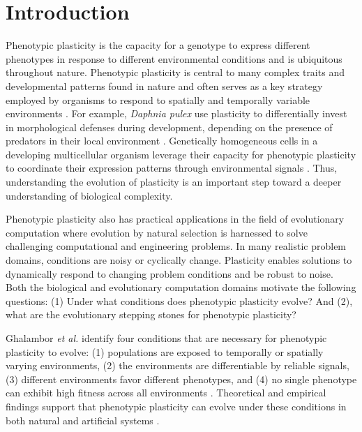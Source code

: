 \section{Introduction}
\label{chapter:origins-of-plasticity:sec:introduction}

Phenotypic plasticity is the capacity for a genotype to express different phenotypes in response to different environmental conditions \citep{ghalambor_behavior_2010} and is ubiquitous throughout nature. 
Phenotypic plasticity is central to many complex traits and developmental patterns found in nature and often serves as a key strategy employed by organisms to respond to spatially and temporally variable environments \citep{bradshaw_evolutionary_1965,murren_constraints_2015}.
For example, \textit{Daphnia pulex} use plasticity to differentially invest in morphological defenses during development, depending on the presence of predators in their local environment \citep{black_demographic_1990}. 
Genetically homogeneous cells in a developing multicellular organism leverage their capacity for phenotypic plasticity to coordinate their expression patterns through environmental signals \citep{schlichting_origins_2003}.
Thus, understanding the evolution of plasticity is an important step toward a deeper understanding of biological complexity. 

Phenotypic plasticity also has practical applications in the field of evolutionary computation where evolution by natural selection is harnessed to solve challenging computational and engineering problems. 
In many realistic problem domains, conditions are noisy or cyclically change. 
Plasticity enables solutions to dynamically respond to changing problem conditions and be robust to noise. 
Both the biological and evolutionary computation domains motivate the following questions: 
(1) Under what conditions does phenotypic plasticity evolve? 
And (2), what are the evolutionary stepping stones for phenotypic plasticity? 

Ghalambor \textit{et al.} identify four conditions that are necessary for phenotypic plasticity to evolve: 
(1) populations are exposed to temporally or spatially varying environments, 
(2) the environments are differentiable by reliable signals, 
(3) different environments favor different phenotypes, and 
(4) no single phenotype can exhibit high fitness across all environments \citep{ghalambor_behavior_2010}. 
Theoretical and empirical findings support that phenotypic plasticity can evolve under these conditions in both natural and artificial systems \citep{clune_investigating_2007,goldsby_evolution_2010,goldsby_evolutionary_2014,hallsson_selection_2012,nolfi_phenotypic_1994}.

